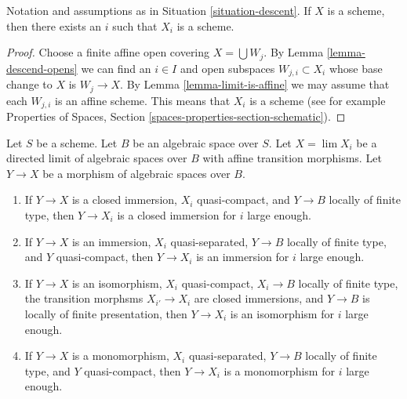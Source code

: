 \begin{lemma}
\label{lemma-limit-is-scheme}
Notation and assumptions as in Situation \ref{situation-descent}.
If $X$ is a scheme, then there exists an $i$ such that $X_i$ is a scheme.
\end{lemma}

\begin{proof}
Choose a finite affine open covering $X = \bigcup W_j$.
By Lemma \ref{lemma-descend-opens}
we can find an $i \in I$ and open subspaces $W_{j, i} \subset X_i$
whose base change to $X$ is $W_j \to X$. By
Lemma \ref{lemma-limit-is-affine} we may assume that
each $W_{j, i}$ is an affine scheme. This means that $X_i$
is a scheme (see for example
Properties of Spaces, Section \ref{spaces-properties-section-schematic}).
\end{proof}

\begin{lemma}
\label{lemma-finite-type-eventually-closed}
Let $S$ be a scheme. Let $B$ be an algebraic space over $S$.
Let $X = \lim X_i$ be a directed limit of
algebraic spaces over $B$ with affine transition morphisms.
Let $Y \to X$ be a morphism of algebraic spaces over $B$.
\begin{enumerate}
\item If $Y \to X$ is a closed immersion, $X_i$ quasi-compact, and
$Y \to B$ locally of finite type, then $Y \to X_i$ is a closed immersion
for $i$ large enough.
\item If $Y \to X$ is an immersion, $X_i$ quasi-separated, $Y \to B$
locally of finite type, and $Y$ quasi-compact, then $Y \to X_i$ is an
immersion for $i$ large enough.
\item If $Y \to X$ is an isomorphism, $X_i$ quasi-compact,
$X_i \to B$ locally of finite type, the transition morphsms
$X_{i'} \to X_i$ are closed immersions, and $Y \to B$ is locally
of finite presentation, then $Y \to X_i$ is an isomorphism for $i$
large enough.
\item If $Y \to X$ is a monomorphism, $X_i$ quasi-separated,
$Y \to B$ locally of finite type, and $Y$ quasi-compact, then
$Y \to X_i$ is a monomorphism for $i$ large enough.
\end{enumerate}
\end{lemma}

